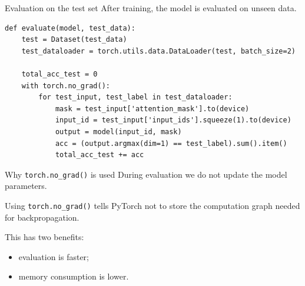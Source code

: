 \documentclass[aspectratio=169]{beamer}
\begin{document}
\begin{frame}[fragile]{Evaluation on the test set}
After training, the model is evaluated on unseen data.

\begin{lstlisting}[style=pythonstyle]
def evaluate(model, test_data):
    test = Dataset(test_data)
    test_dataloader = torch.utils.data.DataLoader(test, batch_size=2)

    total_acc_test = 0
    with torch.no_grad():
        for test_input, test_label in test_dataloader:
            mask = test_input['attention_mask'].to(device)
            input_id = test_input['input_ids'].squeeze(1).to(device)
            output = model(input_id, mask)
            acc = (output.argmax(dim=1) == test_label).sum().item()
            total_acc_test += acc
\end{lstlisting}
\end{frame}

\begin{frame}{Why \texttt{torch.no\_grad()} is used}
During evaluation we do not update the model parameters.

\vspace{0.3cm}

Using \texttt{torch.no\_grad()} tells PyTorch not to store the computation graph needed for backpropagation.

\vspace{0.3cm}

This has two benefits:
\begin{itemize}
    \item evaluation is faster;
    \item memory consumption is lower.
\end{itemize}
\end{frame}
\end{document}
